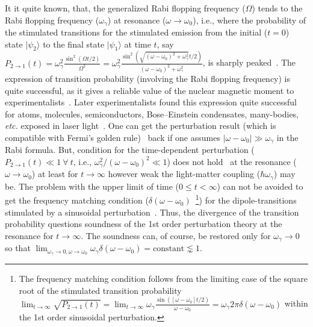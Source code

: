 \documentclass[aps,pra,twocolumn,showpacs,preprintnumbers,amsmath,amssymb,footinbib]{revtex4}
\begin{document}
It it quite known, that, the generalized Rabi flopping frequency ($\Omega$) tends to the Rabi flopping frequency ($\omega_\gamma$) at resonance ($\omega\rightarrow\omega_0$), i.e., where the probability of the stimulated transitions  for the stimulated emission from the initial ($t=0$) state $|\psi_2\rangle$ to the final state $|\psi_1\rangle$ at time $t$, say $P_{2\rightarrow1}(t)=\omega_\gamma^2\frac{\sin^2(\Omega t/2)}{\Omega^2}=\omega_\gamma^2\frac{\sin^2(\sqrt{(\omega-\omega_0)^2+\omega_\gamma^2}t/2)}{(\omega-\omega_0)^2+\omega_\gamma^2}$, is sharply peaked~\cite{Rabi2,Griffiths,Sakurai,Shirley}.  The expression of transition probability (involving the Rabi flopping frequency) is quite successful, as it gives a reliable value of the nuclear magnetic moment to experimentalists~\cite{Rabi2}. Later experimentalists found this expression quite successful for atoms, molecules, semiconductors, Bose--Einstein condensates, many-bodies, \textit{etc.} exposed in laser light~\cite{Hocker,Cundiff,Brune,Meekhof,Donley,Udem,Dudin}. One can get the perturbation result (which is compatible with Fermi's golden rule)~\cite{Dirac,Griffiths} back if one assumes $|\omega-\omega_0|\gg\omega_\gamma$ in the Rabi formula. But, condition for the time-dependent perturbation ($P_{2\rightarrow1}(t)\ll1~\forall~t$, i.e., $\omega_\gamma^2/(\omega-\omega_0)^2\ll1$) does not hold~\cite{Griffiths} at the resonance ($\omega\rightarrow\omega_0$) at least for $t\rightarrow\infty$ however weak the light-matter coupling ($\hbar\omega_\gamma$) may be. The problem with the upper limit of time ($0\le t<\infty$) can not be avoided to get the frequency matching condition ($\delta(\omega-\omega_0)$~\footnote{The frequency matching condition follows from the limiting case of the square root of the stimulated transition probability $\lim_{t\rightarrow\infty}\sqrt{P_{2\rightarrow1}(t)}=\lim_{t\rightarrow\infty}\omega_\gamma\frac{\sin([\omega-\omega_0]t/2)}{\omega-\omega_0}=\omega_\gamma2\pi\delta(\omega-\omega_0)$ within the 1st order sinusoidal perturbation.}) for the dipole-transitions stimulated by a sinusoidal perturbation~\cite{Dirac,Griffiths}. Thus, the divergence of the transition probability questions soundness of the 1st order perturbation theory at the resonance for $t\rightarrow\infty$. The soundness can, of course, be restored only for $\omega_\gamma\rightarrow0$ so that $\lim_{\omega_\gamma\rightarrow0, \omega\rightarrow\omega_0}\omega_\gamma\delta(\omega-\omega_0)=\text{constant}\lnsim1$.
\end{document}
